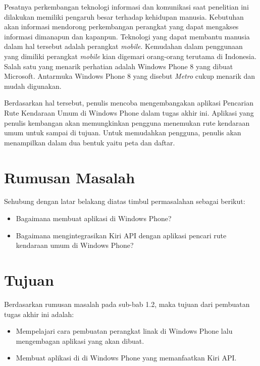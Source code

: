 Pesatnya perkembangan teknologi informasi dan komunikasi saat penelitian ini dilakukan memiliki pengaruh besar terhadap kehidupan manusia. Kebutuhan akan informasi mendorong perkembangan perangkat yang dapat mengakses informasi dimanapun dan kapanpun. Teknologi yang dapat membantu manusia dalam hal tersebut adalah perangkat \textit{mobile}. Kemudahan dalam penggunaan yang dimiliki perangkat \textit{mobile} kian digemari orang-orang terutama di Indonesia. Salah satu yang menarik perhatian adalah Windows Phone 8 yang dibuat Microsoft. Antarmuka Windows Phone 8 yang disebut \textit{Metro} cukup menarik dan mudah digunakan. 

Berdasarkan hal tersebut, penulis mencoba mengembangakan aplikasi Pencarian Rute Kendaraan Umum di Windows Phone dalam tugas akhir ini. Aplikasi yang penulis kembangan akan memungkinkan pengguna menemukan rute kendaraan umum untuk sampai di tujuan. Untuk memudahkan pengguna, penulis akan menampilkan dalam dua bentuk yaitu peta dan daftar. 

\section{Rumusan Masalah}
\label{sec:rumusan_masalah}
Sehubung dengan latar belakang diatas timbul permasalahan sebagai berikut:
\begin{itemize}
	\item Bagaimana membuat aplikasi di Windows Phone?
	\item Bagaimana mengintegrasikan Kiri API dengan aplikasi pencari rute kendaraan umum di Windows Phone?
\end{itemize}

\section{Tujuan}
\label{sec:tujuan}
Berdasarkan rumusan masalah pada sub-bab 1.2, maka tujuan dari pembuatan tugas akhir ini adalah:
\begin{itemize}
	\item Mempelajari cara pembuatan perangkat linak di Windows Phone lalu mengembagan aplikasi yang akan dibuat.
	\item Membuat aplikasi di di Windows Phone yang memanfaatkan Kiri API.
\end{itemize}

